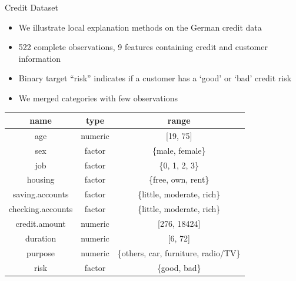 \documentclass[11pt,compress,t,notes=noshow, aspectratio=169, xcolor=table]{beamer}
\begin{document}

\begin{vbframe}{Credit Dataset}

	\begin{itemize}
		\item We illustrate local explanation methods on the German credit data 
		\item 522 complete observations, 9 features containing credit and customer information
		\item Binary target ``risk'' indicates if a customer has a `good' or `bad' credit risk
		\item We merged categories with few observations 
	\end{itemize}
		\begin{center}
			\footnotesize
			\begin{tabular}{ccc}
				\toprule
				name & type & range\\
				\midrule
				age & numeric & [19, 75]\\
				sex & factor & \{male, female\}\\
				job & factor & \{0, 1, 2, 3\}\\
				housing & factor & \{free, own, rent\}\\
				saving.accounts & factor & \{little, moderate, rich\}\\
				checking.accounts & factor & \{little, moderate, rich\}\\
				credit.amount & numeric & [276, 18424]\\
				duration & numeric &  [6, 72]\\
				purpose & numeric &  \{others, car, furniture, radio/TV\}\\
				risk & factor & \{good, bad\}\\
				\bottomrule
			\end{tabular}
		\end{center}
\end{vbframe}

\endlecture
\end{document}
